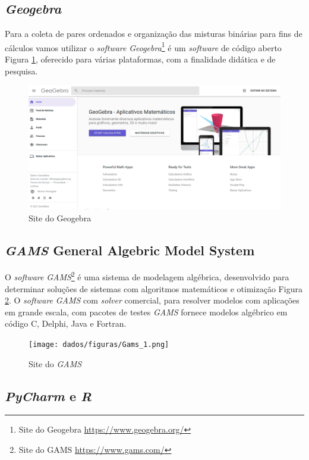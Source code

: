 \subsection{\textit{Geogebra}}
Para a coleta de pares ordenados e organização das misturas binárias para fins de cálculos vamos utilizar o \textit{software} \textit{Geogebra}\footnote{Site do Geogebra \url{https://www.geogebra.org/}} é um \textit{software} de código aberto Figura \ref{fig:11}, oferecido para várias plataformas, com a finalidade didática e de pesquisa. 
\begin{figure}[H]
	\centering
	\includegraphics[width=0.9\linewidth 
	]{dados/figuras/Geogebra_1.png}
	\caption[Site do Geogebra]{Site do Geogebra}
	\label{fig:11}
\end{figure}

\subsection{\textit{GAMS} General Algebric Model System}

O \textit{software} \textit{GAMS}\footnote{Site do GAMS \url{https://www.gams.com/}} é uma sistema de modelagem algébrica, desenvolvido para determinar soluções de sistemas com algoritmos matemáticos e otimização Figura \ref{fig:14}. O \textit{software} \textit{GAMS} com \textit{solver} comercial, para resolver modelos com aplicações em grande escala, com pacotes de testes \textit{GAMS} fornece modelos algébrico em código C, Delphi, Java e Fortran. 

\begin{figure}[H]
	\centering
	\texttt{[image: dados/figuras/Gams\_1.png]}
	\caption[Site do \textit{GAMS}]{Site do \textit{GAMS}}
	\label{fig:14}
\end{figure}

\subsection{\textit{PyCharm} e \textit{R}}


